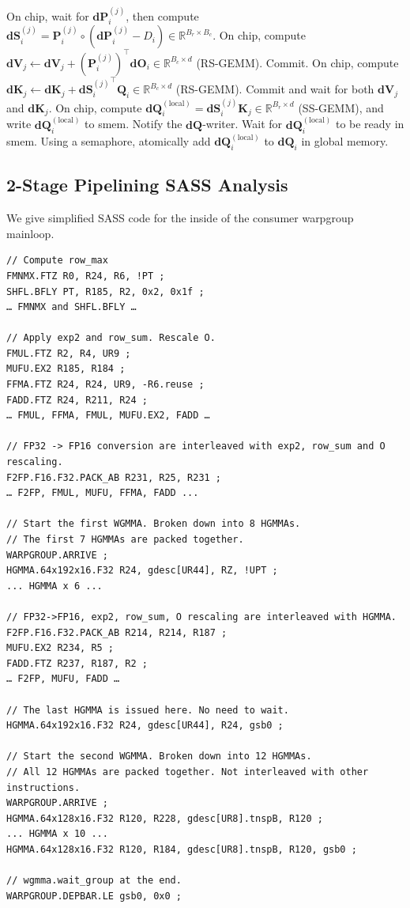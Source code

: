 \documentclass{article}
\newcommand{\vQ}{\mathbf{Q}}
\newcommand{\vK}{\mathbf{K}}
\newcommand{\vdQ}{\mathbf{dQ}}
\newcommand{\vdK}{\mathbf{dK}}
\newcommand{\vdV}{\mathbf{dV}}
\newcommand{\vdS}{\mathbf{dS}}
\newcommand{\vP}{\mathbf{P}}
\newcommand{\vdP}{\mathbf{dP}}
\newcommand{\vdO}{\mathbf{dO}}
\begin{document}
\begin{algorithm}[H]
\begin{algorithmic}[1]
\STATE On chip, wait for $\vdP_i^{(j)}$, then compute $\vdS_{i}^{(j)} = \vP_{i}^{(j)} \circ (\vdP_{i}^{(j)} - D_i) \in \mathbb{R}^{B_r \times B_c}$.
\STATE On chip, compute
$\vdV_j \leftarrow \vdV_j + (\vP_{i}^{(j)})^\top \vdO_i \in \mathbb{R}^{B_c \times d}$ (RS-GEMM). Commit.
\STATE On chip, compute $\vdK_{j} \leftarrow \vdK_j + {\vdS_{i}^{(j)}}^\top \vQ_i \in \mathbb{R}^{B_c \times
  d}$ (RS-GEMM). Commit and wait for both $\vdV_j$ and $\vdK_j$.
\STATE On chip, compute $\vdQ_{i}^{(\mathrm{local})} = \vdS_{i}^{(j)} \vK_j \in
\mathbb{R}^{B_r \times d}$ (SS-GEMM), and write $\vdQ_i^{(\mathrm{local})}$ to smem. Notify
the $\vdQ$-writer.
\ENDFOR
\ELSIF{in $\vdQ$-writer warp}
\STATE Wait for $\vdQ_i^{(\mathrm{local})}$ to be ready in smem.
\STATE Using a semaphore, atomically add $\vdQ_i^{(\mathrm{local})}$ to $\vdQ_i$ in global memory.
\ENDFOR
\ENDIF
\end{algorithmic}
\end{algorithm}

\subsection{2-Stage Pipelining SASS Analysis}
\label{sec:2-stage-sass}

We give simplified SASS code for the inside of the consumer warpgroup mainloop.
\begin{small}
\begin{verbatim}
// Compute row_max
FMNMX.FTZ R0, R24, R6, !PT ;
SHFL.BFLY PT, R185, R2, 0x2, 0x1f ;
… FMNMX and SHFL.BFLY … 

// Apply exp2 and row_sum. Rescale O.
FMUL.FTZ R2, R4, UR9 ;
MUFU.EX2 R185, R184 ;                                            
FFMA.FTZ R24, R24, UR9, -R6.reuse ;
FADD.FTZ R24, R211, R24 ;                              
… FMUL, FFMA, FMUL, MUFU.EX2, FADD …

// FP32 -> FP16 conversion are interleaved with exp2, row_sum and O rescaling.
F2FP.F16.F32.PACK_AB R231, R25, R231 ;
… F2FP, FMUL, MUFU, FFMA, FADD ...

// Start the first WGMMA. Broken down into 8 HGMMAs.
// The first 7 HGMMAs are packed together.
WARPGROUP.ARRIVE ;
HGMMA.64x192x16.F32 R24, gdesc[UR44], RZ, !UPT ;
... HGMMA x 6 ...

// FP32->FP16, exp2, row_sum, O rescaling are interleaved with HGMMA. 
F2FP.F16.F32.PACK_AB R214, R214, R187 ; 
MUFU.EX2 R234, R5 ;
FADD.FTZ R237, R187, R2 ;
… F2FP, MUFU, FADD …

// The last HGMMA is issued here. No need to wait.
HGMMA.64x192x16.F32 R24, gdesc[UR44], R24, gsb0 ;

// Start the second WGMMA. Broken down into 12 HGMMAs.
// All 12 HGMMAs are packed together. Not interleaved with other instructions.
WARPGROUP.ARRIVE ;
HGMMA.64x128x16.F32 R120, R228, gdesc[UR8].tnspB, R120 ;
... HGMMA x 10 ...
HGMMA.64x128x16.F32 R120, R184, gdesc[UR8].tnspB, R120, gsb0 ;

// wgmma.wait_group at the end.
WARPGROUP.DEPBAR.LE gsb0, 0x0 ; 

\end{verbatim}
\end{small}
\end{document}

